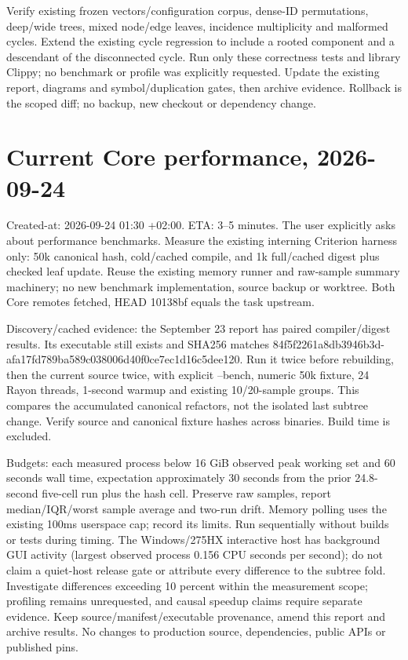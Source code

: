 \documentclass[11pt,a4paper]{article}
\begin{document}
Verify existing frozen vectors/configuration corpus, dense-ID permutations,
deep/wide trees, mixed node/edge leaves, incidence multiplicity and malformed
cycles. Extend the existing cycle regression to include a rooted component and
a descendant of the disconnected cycle. Run only these correctness tests and
library Clippy; no benchmark or profile was explicitly requested. Update the
existing report, diagrams and symbol/duplication gates, then archive evidence.
Rollback is the scoped diff; no backup, new checkout or dependency change.
\section*{Current Core performance, 2026-09-24}
Created-at: 2026-09-24 01:30 +02:00. ETA: 3--5 minutes. The user explicitly
asks about performance benchmarks. Measure the existing interning Criterion
harness only: 50k canonical hash, cold/cached compile, and 1k full/cached digest
plus checked leaf update. Reuse the existing memory runner and raw-sample
summary machinery; no new benchmark implementation, source backup or worktree.
Both Core remotes fetched, HEAD 10138bf equals the task upstream.

Discovery/cached evidence: the September 23 report has paired compiler/digest
results. Its executable still exists and SHA256 matches 84f5f2261a8db3946b3d-
afa17fd789ba589c038006d40f0ce7ec1d16c5dee120. Run it twice before rebuilding,
then the current source twice, with explicit --bench, numeric 50k fixture,
24 Rayon threads, 1-second warmup and existing 10/20-sample groups. This compares
the accumulated canonical refactors, not the isolated last subtree change.
Verify source and canonical fixture hashes across binaries. Build time is excluded.

Budgets: each measured process below 16 GiB observed peak working set and
60 seconds wall time, expectation approximately 30 seconds from the prior
24.8-second five-cell run plus the hash cell. Preserve raw samples, report
median/IQR/worst sample average and two-run drift. Memory polling uses the
existing 100ms userspace cap; record its limits. Run sequentially without builds
or tests during timing. The Windows/275HX interactive host has background GUI
activity (largest observed process 0.156 CPU seconds per second); do not claim
a quiet-host release gate or attribute every difference to the subtree fold.
Investigate differences exceeding 10 percent within the measurement scope;
profiling remains unrequested, and causal speedup claims require separate evidence.
Keep source/manifest/executable provenance, amend this report and archive results.
No changes to production source, dependencies, public APIs or published pins.
\end{document}
